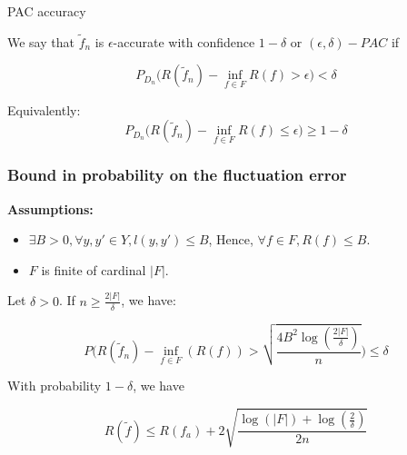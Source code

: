 \documentclass[
10pt, %
a4paper, %
oneside, %
headinclude,footinclude, %
BCOR5mm, %
]{scrartcl}
\begin{document}
\begin{definition}{PAC accuracy}

    We say that $ \tilde{f}_n$ is $\epsilon$-accurate with confidence $1-\delta$ or $(\epsilon, \delta)-PAC$ if

    \begin{equation*}
	P_{D_n}\Big(R( \tilde{f}_n)- \inf_{f\in F}R(f)> \epsilon \Big)<\delta
    \end{equation*}

    \begin{remark}
         Equivalently:
	 \begin{equation*}
	P_{D_n}\Big(R( \tilde{f}_n)- \inf_{f\in F}R(f)\leq  \epsilon \Big)\geq 1-\delta
	 \end{equation*}
    \end{remark}
\end{definition}


    \subsubsection{\large\color{Periwinkle}Bound in probability on the fluctuation error}

    \begin{theorem}

	\textbf{{Assumptions:}} 
	\begin{itemize}
	    \item $\exists B>0, \forall y,y'\in Y, l(y,y')\leq B$, Hence, $\forall f\in F, R(f)\leq B$.
	    \item $ F $ is finite of cardinal $|F|$.
	\end{itemize}

	Let $\delta>0$. If $n\geq \frac{2|F|}{\delta} $, we have:



	\begin{equation*}
	    P\Big( R( \tilde{f}_n)-\inf_{f\in F}(R(f))> \sqrt{ \frac{4B^2 \log( \frac{2|F|}{\delta} )}{n} }  \Big)\leq \delta 
	\end{equation*}
    \end{theorem}

    \begin{corollary}
        
	With probability $ 1-\delta$, we have

	\begin{equation}
	    R( \tilde{f})\leq R(f_a)+2 \sqrt{ \frac{ \log(|F|)+ \log( \frac{2}{\delta} )}{2n} } 
	\end{equation}
    \end{corollary}
\end{document}
